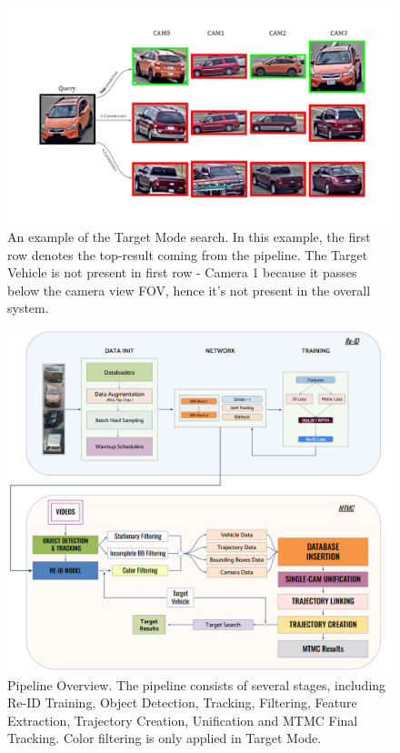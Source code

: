 \begin{figure}[H]
    \centering
    \includegraphics[width=1.0\textwidth]{images/TargetSearch.png}
    \caption[Target Search Results]{An example of the Target Mode search. In this example, the first row denotes the top-result coming from the pipeline. The Target Vehicle is not present in first row - Camera 1 because it passes below the camera view FOV, hence it's not present in the overall system.}
    \label{fig:TargetSearch}
\end{figure}

\begin{figure}[ht]
    \centering
    \includegraphics[width=1.0\textwidth]{images/PipelineOverview.png}
    \caption[Pipeline overview]{Pipeline Overview. The pipeline consists of several stages, including Re-ID Training, Object Detection, Tracking, Filtering, Feature Extraction, Trajectory Creation, Unification and MTMC Final Tracking. Color filtering is only applied in Target Mode.}
    \label{fig:PipelineOverview}
\end{figure}
